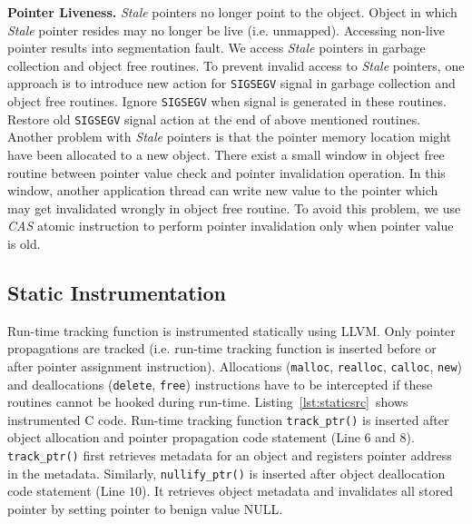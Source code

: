 \textbf{Pointer Liveness.} 
\textit{Stale} pointers no longer point to the object. Object in which \textit{Stale} pointer resides may no longer be live (i.e. unmapped). Accessing non-live pointer results into segmentation fault. We access \textit{Stale} pointers in garbage collection and object free routines. To prevent invalid access to \textit{Stale} pointers, one approach is to introduce new action for \texttt{SIGSEGV} signal in garbage collection and object free routines. Ignore \texttt{SIGSEGV} when signal is generated in these routines. Restore old \texttt{SIGSEGV} signal action at the end of above mentioned routines. Another problem with \textit{Stale} pointers is that the pointer memory location might have been allocated to a new object. There exist a small window in object free routine between pointer value check and pointer invalidation operation. In this window, another application thread can write new value to the pointer which may get invalidated wrongly in object free routine. To avoid this problem, we use \emph{CAS} atomic instruction to perform pointer invalidation only when pointer value is old.

\subsection{Static Instrumentation}
Run-time tracking function is instrumented statically using LLVM. Only pointer propagations are tracked (i.e. run-time tracking function is inserted before or after pointer assignment instruction). Allocations (\texttt{malloc}, \texttt{realloc}, \texttt{calloc}, \texttt{new}) and deallocations (\texttt{delete}, \texttt{free}) instructions have to be intercepted if these routines cannot be hooked during run-time. Listing~\ref{lst:staticsrc}\ shows instrumented C code. Run-time tracking function \texttt{track\_ptr()} is inserted after object allocation and pointer propagation code statement (Line $6$ and $8$). \texttt{track\_ptr()} first retrieves metadata for an object and registers pointer address in the metadata. Similarly, \texttt{nullify\_ptr()} is inserted after object deallocation code statement (Line $10$). It retrieves object metadata and invalidates all stored pointer by setting pointer to benign value NULL.    

 

